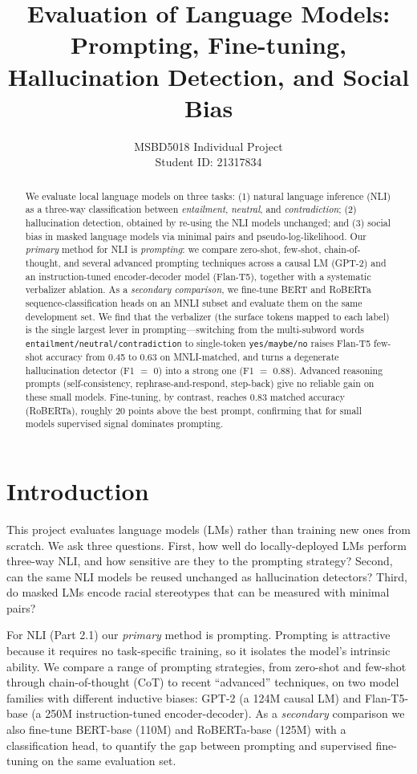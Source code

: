 \documentclass[11pt]{article}
\title{\textbf{Evaluation of Language Models: Prompting, Fine-tuning, Hallucination Detection, and Social Bias}}
\author{MSBD5018 Individual Project\\Student ID: 21317834}
\date{}
\begin{document}
\maketitle

\begin{abstract}
We evaluate local language models on three tasks: (1) natural language inference (NLI) as a three-way classification between \emph{entailment}, \emph{neutral}, and \emph{contradiction}; (2) hallucination detection, obtained by re-using the NLI models unchanged; and (3) social bias in masked language models via minimal pairs and pseudo-log-likelihood. Our \emph{primary} method for NLI is \emph{prompting}: we compare zero-shot, few-shot, chain-of-thought, and several advanced prompting techniques across a causal LM (GPT-2) and an instruction-tuned encoder-decoder model (Flan-T5), together with a systematic verbalizer ablation. As a \emph{secondary comparison}, we fine-tune BERT and RoBERTa sequence-classification heads on an MNLI subset and evaluate them on the same development set. We find that the verbalizer (the surface tokens mapped to each label) is the single largest lever in prompting---switching from the multi-subword words \texttt{entailment/neutral/contradiction} to single-token \texttt{yes/maybe/no} raises Flan-T5 few-shot accuracy from 0.45 to 0.63 on MNLI-matched, and turns a degenerate hallucination detector (F1 $=$ 0) into a strong one (F1 $=$ 0.88). Advanced reasoning prompts (self-consistency, rephrase-and-respond, step-back) give no reliable gain on these small models. Fine-tuning, by contrast, reaches 0.83 matched accuracy (RoBERTa), roughly 20 points above the best prompt, confirming that for small models supervised signal dominates prompting.
\end{abstract}

\section{Introduction}
This project evaluates language models (LMs) rather than training new ones from scratch. We ask three questions. First, how well do locally-deployed LMs perform three-way NLI, and how sensitive are they to the prompting strategy? Second, can the same NLI models be reused unchanged as hallucination detectors? Third, do masked LMs encode racial stereotypes that can be measured with minimal pairs?

For NLI (Part 2.1) our \emph{primary} method is prompting. Prompting is attractive because it requires no task-specific training, so it isolates the model's intrinsic ability. We compare a range of prompting strategies, from zero-shot and few-shot through chain-of-thought (CoT) to recent ``advanced'' techniques, on two model families with different inductive biases: GPT-2 (a 124M causal LM) and Flan-T5-base (a 250M instruction-tuned encoder-decoder). As a \emph{secondary} comparison we also fine-tune BERT-base (110M) and RoBERTa-base (125M) with a classification head, to quantify the gap between prompting and supervised fine-tuning on the same evaluation set.
\end{document}
